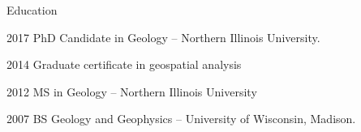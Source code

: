 \begin{cvlist}{Education}

\item[2017] PhD Candidate in Geology -- Northern Illinois University.
\item[2014] Graduate certificate in geospatial analysis 
\item[2012] MS in Geology -- Northern Illinois University
\item[2007] BS Geology and Geophysics -- University of Wisconsin, Madison.

\end{cvlist}

 

